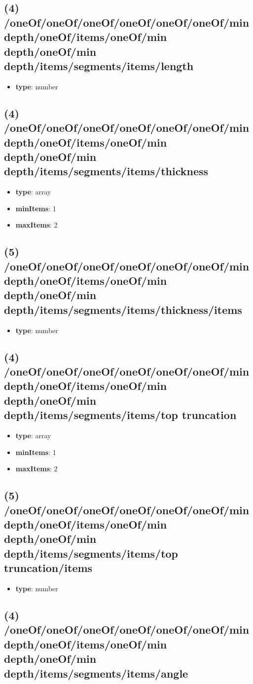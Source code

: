 \subsection{(4) /oneOf/oneOf/oneOf/oneOf/oneOf/oneOf/min depth/oneOf/items/oneOf/min depth/oneOf/min depth/items/segments/items/length}
\begin{itemize}[leftmargin=4em]\item {\bf type}: number
\end{itemize}\subsection{(4) /oneOf/oneOf/oneOf/oneOf/oneOf/oneOf/min depth/oneOf/items/oneOf/min depth/oneOf/min depth/items/segments/items/thickness}
\begin{itemize}[leftmargin=4em]\item {\bf type}: array
\item {\bf minItems}: 1
\item {\bf maxItems}: 2
\end{itemize}\subsection{(5) /oneOf/oneOf/oneOf/oneOf/oneOf/oneOf/min depth/oneOf/items/oneOf/min depth/oneOf/min depth/items/segments/items/thickness/items}
\begin{itemize}[leftmargin=5em]\item {\bf type}: number
\end{itemize}\subsection{(4) /oneOf/oneOf/oneOf/oneOf/oneOf/oneOf/min depth/oneOf/items/oneOf/min depth/oneOf/min depth/items/segments/items/top truncation}
\begin{itemize}[leftmargin=4em]\item {\bf type}: array
\item {\bf minItems}: 1
\item {\bf maxItems}: 2
\end{itemize}\subsection{(5) /oneOf/oneOf/oneOf/oneOf/oneOf/oneOf/min depth/oneOf/items/oneOf/min depth/oneOf/min depth/items/segments/items/top truncation/items}
\begin{itemize}[leftmargin=5em]\item {\bf type}: number
\end{itemize}\subsection{(4) /oneOf/oneOf/oneOf/oneOf/oneOf/oneOf/min depth/oneOf/items/oneOf/min depth/oneOf/min depth/items/segments/items/angle}
